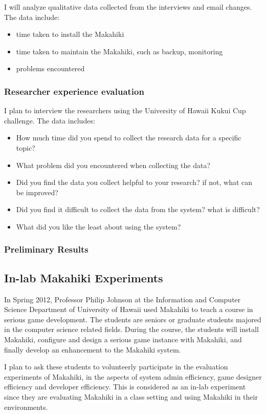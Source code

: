 I will analyze qualitative data collected from the interviews and email changes. The data include:
\begin{itemize}
 \item time taken to install the Makahiki
 \item time taken to maintain the Makahiki, such as backup, monitoring
 \item problems encountered
\end{itemize}

\subsubsection{Researcher experience evaluation}
I plan to interview the researchers using the University of Hawaii Kukui Cup challenge. The data includes:
\begin{itemize}
\item How much time did you spend to collect the research data for a specific topic?
\item What problem did you encountered when collecting the data?
\item Did you find the data you collect helpful to your research? if not, what can be improved?
\item Did you find it difficult to collect the data from the system? what is difficult?
\item What did you like the least about using the system?
\end{itemize}

\subsubsection{Preliminary Results}

\subsection{In-lab Makahiki Experiments}
In Spring 2012, Professor Philip Johnson at the Information and Computer Science Department of University of Hawaii used Makahiki to teach a course in serious game development. The students are seniors or graduate students majored in the computer science related fields. During the course, the students will install Makahiki, configure and design a serious game instance with Makahiki, and finally develop an enhancement to the Makahiki system.

I plan to ask these students to volunteerly participate in the evaluation experiments of Makahiki, in the aspects of system admin efficiency, game designer efficiency and developer efficiency. This is considered as an in-lab experiment since they are evaluating Makahiki in a class setting and using Makahiki in their environments.


